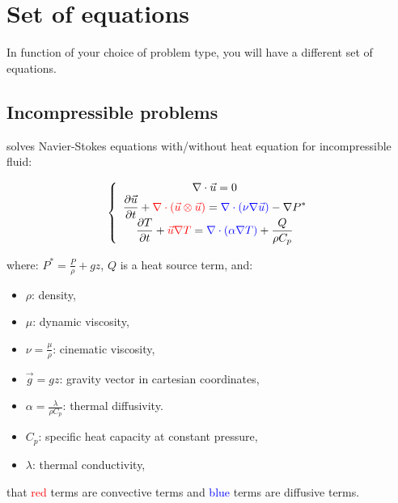 \section{Set of equations}
In function of your choice of problem type, you will have a different set of equations.

\subsection{Incompressible problems}
\trust solves Navier-Stokes equations with/without heat equation for incompressible fluid:

$$
\left\{
\begin{array}{c}
\nabla \cdot \vec u =0 \\
\displaystyle{\frac{\partial \vec u }{\partial t} + \textcolor{red}{\nabla \cdot (\vec u \otimes \vec u)} = \textcolor{blue}{\nabla \cdot (\nu \nabla \vec u)} - \nabla P^* } \\
\displaystyle{\frac{\partial T}{\partial t} + \textcolor{red}{\vec u \nabla T} = \textcolor{blue}{\nabla \cdot (\alpha \nabla T)} + \frac{Q}{\rho C_p}}
\end{array}
\right.
$$

where: $\displaystyle{P^*=\frac{P}{\rho} + g z}$, $Q$ is a heat source term, and:

\begin{itemize}
\item $\rho$: density,
\item $\mu$: dynamic viscosity,
\item $\displaystyle{\nu=\frac{\mu}{\rho}}$: cinematic viscosity,
\item $\vec g=g z$: gravity vector in cartesian coordinates,
\item $\displaystyle{\alpha=\frac{\lambda}{\rho C_p}}$: thermal diffusivity.
\item $C_p$: specific heat capacity at constant pressure,
\item $\lambda$: thermal conductivity,
\end{itemize}

\Note that \textcolor{red}{red} terms are convective terms and \textcolor{blue}{blue} terms are diffusive terms.\\

